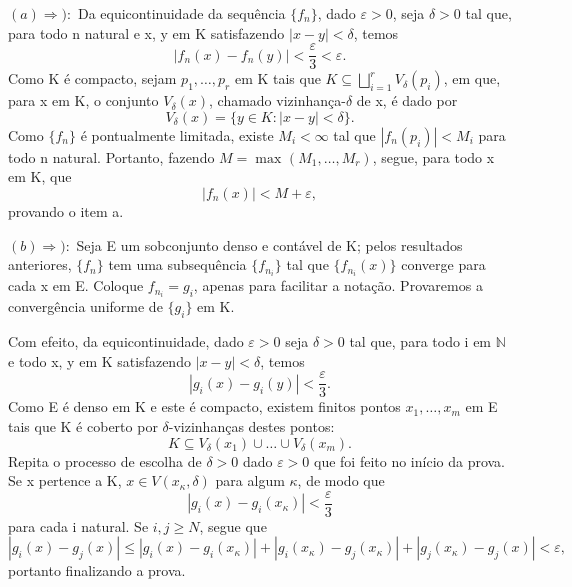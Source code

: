 \documentclass[../analysis_notes.tex]{subfiles}
\begin{document}
\begin{proof*}
	\((a)\Rightarrow ):\) Da equicontinuidade da sequência \(\{f_{n}\}\), dado \(\varepsilon > 0\), seja \(\delta >0\) tal que, para todo n natural e x, y em K satisfazendo \(|x-y|<\delta \), temos
	\[
		|f_{n}(x)-f_{n}(y)|<\frac{\varepsilon }{3}<\varepsilon .
	\]
	Como K é compacto, sejam \(p_{1},\dotsc , p_{r}\) em K tais que \(K\subseteq \bigsqcup_{i=1}^{r}V_{\delta }(p_{i})\), em que, para x em K, o conjunto \(V_{\delta }(x)\), chamado vizinhança-\(\delta \) de x, é dado por
	\[
		V_{\delta }(x)=\{y\in K: |x-y|<\delta \}.
	\]
	Como \(\{f_{n}\}\) é pontualmente limitada, existe \(M_{i}<\infty\) tal que \(|f_{n}(p_{i})|<M_{i}\) para todo n natural. Portanto, fazendo \(M=\max_{}(M_{1},\dotsc , M_{r})\), segue, para todo x em K, que
	\[
		|f_{n}(x)|<M+\varepsilon,
	\]
	provando o item a.

	\((b)\Rightarrow ):\) Seja E um sobconjunto denso e contável de K; pelos resultados anteriores, \(\{f_{n}\}\) tem uma subsequência \(\{f_{n_i}\}\) tal que \(\{f_{n_{i}}(x)\}\) converge para cada x em E. Coloque \(f_{n_{i}}=g_{i}\), apenas para facilitar a notação. Provaremos a convergência uniforme de \(\{g_{i}\}\) em K.

	Com efeito, da equicontinuidade, dado \(\varepsilon > 0\) seja \(\delta > 0\) tal que, para todo i em \(\mathbb{N}\) e todo x, y em K satisfazendo \(|x-y|<\delta \), temos
	\[
		|g_{i}(x)-g_{i}(y)|<\frac{\varepsilon}{3}.
	\]
	Como E é denso em K e este é compacto, existem finitos pontos \(x_{1},\dotsc , x_{m}\) em E tais que K é coberto por \(\delta \)-vizinhanças destes pontos:
	\[
		K\subseteq V_{\delta }(x_1)\cup \dotsc \cup V_{\delta }(x_{m}).
	\]
	Repita o processo de escolha de \(\delta >0\) dado \(\varepsilon > 0\) que foi feito no início da prova. Se x pertence a K, \(x\in V(x_{\kappa }, \delta )\) para algum \(\kappa \), de modo que
	\[
		|g_{i}(x)-g_{i}(x_{\kappa })|<\frac{\varepsilon }{3}
	\]
	para cada i natural. Se \(i, j\geq N\), segue que
	\[
		|g_{i}(x)-g_{j}(x)|\leq |g_{i}(x)-g_{i}(x_{\kappa })|+|g_{i}(x_{\kappa })-g_{j}(x_{\kappa })|+|g_{j}(x_{\kappa })-g_{j}(x)| <\varepsilon,
	\]
	portanto finalizando a prova. \qedsymbol
\end{proof*}
\end{document}
